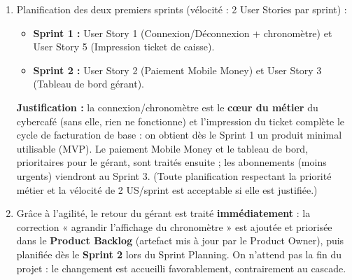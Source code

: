 \documentclass[11pt]{article}
\begin{document}
\begin{corrige}
\begin{enumerate}
\begin{itemize}
    \end{itemize}
    \item Planification des deux premiers sprints (vélocité : 2 User Stories par sprint) :
    \begin{itemize}
        \item \textbf{Sprint 1 :} User Story 1 (Connexion/Déconnexion + chronomètre) et User Story 5 (Impression ticket de caisse).
        \item \textbf{Sprint 2 :} User Story 2 (Paiement Mobile Money) et User Story 3 (Tableau de bord gérant).
    \end{itemize}
    \textbf{Justification :} la connexion/chronomètre est le \textbf{cœur du métier} du cybercafé (sans elle, rien ne fonctionne) et l'impression du ticket complète le cycle de facturation de base : on obtient dès le Sprint 1 un produit minimal utilisable (MVP). Le paiement Mobile Money et le tableau de bord, prioritaires pour le gérant, sont traités ensuite ; les abonnements (moins urgents) viendront au Sprint 3. (Toute planification respectant la priorité métier et la vélocité de 2 US/sprint est acceptable si elle est justifiée.)
    \item Grâce à l'agilité, le retour du gérant est traité \textbf{immédiatement} : la correction « agrandir l'affichage du chronomètre » est ajoutée et priorisée dans le \textbf{Product Backlog} (artefact mis à jour par le Product Owner), puis planifiée dès le \textbf{Sprint 2} lors du Sprint Planning. On n'attend pas la fin du projet : le changement est accueilli favorablement, contrairement au cascade.
\end{enumerate}
\end{corrige}
\end{document}
